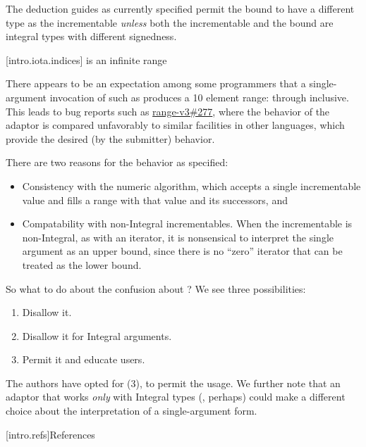 {\pnum
The deduction guides as currently specified permit the bound to have a different
type as the incrementable \textit{unless} both the incrementable and the bound
are integral types with different signedness.

[intro.iota.indices]{ is an infinite range}

\pnum
There appears to be an expectation among some programmers that a single-argument
invocation of  such as  produces a 10 element
range:  through  inclusive. This leads to bug reports such as
\href{https://github.com/ericniebler/range-v3/issues/277}{range-v3\#277}, where
the behavior of the  adaptor is compared unfavorably to similar
facilities in other languages, which provide the desired (by the submitter)
behavior.

\pnum
There are two reasons for the behavior as specified:

\begin{itemize}
\item Consistency with the  numeric algorithm, which accepts a
single incrementable value and fills a range with that value and its successors, and
\item Compatability with non-Integral incrementables. When the incrementable is
non-Integral, as with an iterator, it is nonsensical to interpret the single
argument as an upper bound, since there is no ``zero'' iterator that can be
treated as the lower bound.
\end{itemize}

\pnum
So what to do about the confusion about ? We see three
possibilities:

\begin{enumerate}
\item Disallow it.
\item Disallow it for Integral arguments.
\item Permit it and educate users.
\end{enumerate}

The authors have opted for (3), to permit the usage. We further note that an
adaptor that works \textit{only} with Integral types (,
perhaps) could make a different choice about the interpretation of a
single-argument form.




}%

[intro.refs]{References}

